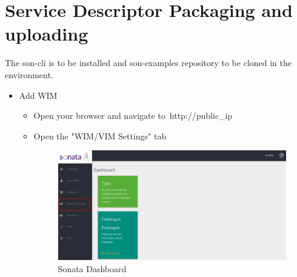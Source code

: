 	\section{Service Descriptor Packaging and uploading}
	\label{sec:Service Descriptor Packaging and uploading}
	The son-cli is to be installed and son-examples repository to be cloned in the environment.
	\begin{itemize}
		\item Add WIM
		\begin{itemize}
			\item Open your browser and navigate to http://public\_ip
			\item Open the "WIM/VIM Settings" tab
			\begin{figure} [h]
				\centering
				\includegraphics[width=0.7\linewidth]{figures/LinkingStep1}
				\caption{Sonata Dashboard}
				\label{fig:linkingstep1}
			\end{figure}
			

\end{itemize}
\end{itemize}
